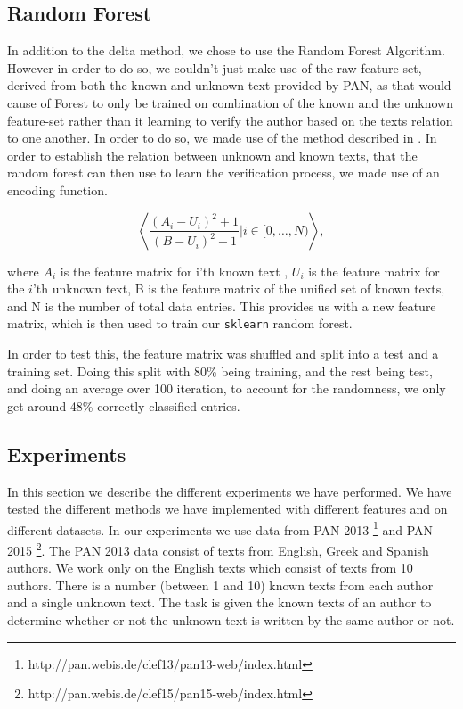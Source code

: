 \subsection{Random Forest}
In addition to the delta method, we chose to use the Random Forest Algorithm.
However in order to do so, we couldn't just make use of the raw feature set,
derived from both the known and unknown text provided by PAN, as that would
cause of Forest to only be trained on combination of the known and the unknown
feature-set rather than it learning to verify the author based on the texts
relation to one another. In order to do so, we made use of the method described
in \cite{pacheco2015}. In order to establish the relation between unknown and
known texts, that the random forest can then use to learn the verification
process, we made use of an encoding function.

\begin{equation}
    \left\langle
        \dfrac{(A_i-U_i)^2+1}{(B-U_i)^2+1}|i \in [0,\dots, N)
    \right\rangle,
\end{equation}

where $A_i$ is the feature matrix for i'th known text , $U_i$ is the feature
matrix for the $i$'th unknown text, B is the feature matrix of the unified set
of known texts, and N is the number of total data entries. This provides us with
a new feature matrix, which is then used to train our \texttt{sklearn} random
forest.

In order to test this, the feature matrix was shuffled and split into a test and
a training set. Doing this split with 80\% being training, and the rest being
test, and doing an average over 100 iteration, to account for the randomness, we
only get around 48\% correctly classified entries.

\subsection{Experiments}
In this section we describe the different experiments we have performed.
We have tested the different methods we have implemented with different
features and on different datasets. In our experiments we use data from PAN
2013 \footnote{http://pan.webis.de/clef13/pan13-web/index.html} and PAN 2015
\footnote{http://pan.webis.de/clef15/pan15-web/index.html}. The PAN 2013 data
consist of texts from English, Greek and Spanish authors. We work only on the
English texts which consist of texts from 10 authors. There is a number (between
1 and 10) known texts from each author and a single unknown text. The task is
given the known texts of an author to determine whether or not the unknown text
is written by the same author or not.

